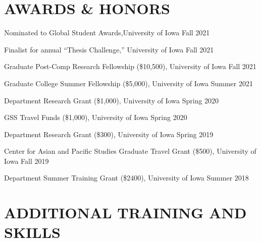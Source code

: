 \documentclass[10.5pt,]{article}
\providecommand{\tightlist}{%
	\setlength{\itemsep}{0pt}\setlength{\parskip}{0pt}}
\renewenvironment{itemize}{
	\begin{list}{}{
			\setlength{\leftmargin}{1.5em}
		}
	}{
	\end{list}
}
\begin{document}
\section{AWARDS \& HONORS}\label{awards-honors}

\begin{itemize}
\tightlist
\item
  Nominated to Global Student Awards,University of Iowa \hfill Fall 2021
\item
  Finalist for annual ``Thesis Challenge,'' University of Iowa
  \hfill Fall 2021
\item
  Graduate Post-Comp Research Fellowship (\$10,500), University of Iowa
  \hfill Fall 2021
\item
  Graduate College Summer Fellowship (\$5,000), University of Iowa
  \hfill Summer 2021
\item
  Department Research Grant (\$1,000), University of Iowa \hfill Spring
  2020
\item
  GSS Travel Funds (\$1,000), University of Iowa \hfill Spring 2020
\item
  Department Research Grant (\$300), University of Iowa \hfill Spring
  2019
\item
  Center for Asian and Pacific Studies Graduate Travel Grant (\$500),
  University of Iowa \hfill Fall 2019
\item
  Department Summer Training Grant (\$2400), University of Iowa
  \hfill Summer 2018
\end{itemize}

\section{ADDITIONAL TRAINING AND
SKILLS}\label{additional-training-and-skills}
\end{document}

